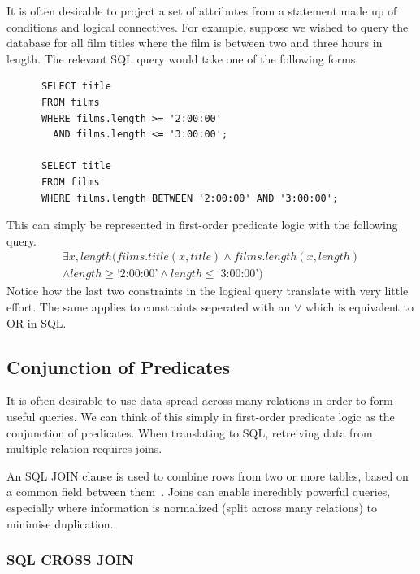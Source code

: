 \documentclass[a4paper, 11pt]{article}
\begin{document}
      It is often desirable to project a set of attributes from a statement
      made up of conditions and logical connectives. For example, suppose we
      wished to query the database for all film titles where the film is between 
      two and three hours in length. The relevant SQL query would take one of
      the following forms.
      \begin{verbatim}
      SELECT title
      FROM films
      WHERE films.length >= '2:00:00'
        AND films.length <= '3:00:00';

      SELECT title
      FROM films
      WHERE films.length BETWEEN '2:00:00' AND '3:00:00';
      \end{verbatim}
      This can simply be represented in first-order predicate logic with the
      following query.
      \begin{multline}
        \exists x, length(films.title(x, title) \land films.length(x,
        length)\\
        \land length \ge \text{`2:00:00'} \land length \le \text{`3:00:00'})
      \end{multline}
      Notice how the last two constraints in the logical query translate
      with very little effort. The same applies to constraints seperated with
      an $\lor$ which is equivalent to OR in SQL.

  \subsection{Conjunction of Predicates}
    \label{sec:joins}

    It is often desirable to use data spread across many relations in order to
    form useful queries. We can think of this simply in first-order predicate
    logic as the conjunction of predicates. When translating to SQL, retreiving
    data from multiple relation requires joins.

    An SQL JOIN clause is used to combine rows from two or more tables, based
    on a common field between them~\cite{w3JOINS}. Joins can enable incredibly
    powerful queries, especially where information
    is normalized (split across many relations) to minimise duplication.

    \subsubsection{SQL CROSS JOIN}
\end{document}
